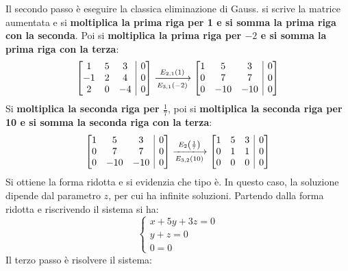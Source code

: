 \documentclass[a4paper]{article}
\makeatletter
\newenvironment{rowequmatbra}[1]{\left[\array{@{}#1@{}}}{\endarray\right]}
\makeatother
\begin{document}
	Il \textcolor{Red3}{secondo passo} è eseguire la classica eliminazione di Gauss. si scrive la matrice aumentata e si \textbf{moltiplica la prima riga per 1 e si somma la prima riga con la seconda}. Poi si \textbf{moltiplica la prima riga per $-2$ e si somma la prima riga con la terza}:
	\begin{equation*}
		\begin{rowequmatbra}{ccc|c}
			 1		& 5		&  3	& 0 \\
			-1 		& 2		&  4 	& 0 \\
			 2		& 0		& -4	& 0			
		\end{rowequmatbra} \xlongrightarrow[E_{3,1}\left(-2\right)]{E_{2,1}\left(1\right)}
		\begin{rowequmatbra}{ccc|c}
			1		& 5		&  3	& 0 \\
			0 		& 7		&  7 	& 0 \\
			0		& -10	& -10	& 0			
		\end{rowequmatbra}
	\end{equation*}
	Si \textbf{moltiplica la seconda riga per $\frac{1}{7}$}, poi si \textbf{moltiplica la seconda riga per 10 e si somma la seconda riga con la terza}:
	\begin{equation*}
		\begin{rowequmatbra}{ccc|c}
			1		& 5		&  3	& 0 \\
			0 		& 7		&  7 	& 0 \\
			0		& -10	& -10	& 0			
		\end{rowequmatbra} \xlongrightarrow[E_{3,2}\left(10\right)]{E_{2}\left(\frac{1}{7}\right)}
		\begin{rowequmatbra}{ccc|c}
			1		& 5		&  3	& 0 \\
			0 		& 1		&  1 	& 0 \\
			0		& 0		&  0	& 0			
		\end{rowequmatbra}
	\end{equation*}
	Si ottiene la forma ridotta e si evidenzia che tipo è. In questo caso, la soluzione dipende dal parametro $z$, per cui ha infinite soluzioni. Partendo dalla forma ridotta e riscrivendo il sistema si ha:
	\begin{equation*}
		\begin{cases}
			x + 5y + 3z = 0 \\
			y + z = 0		\\
			0 = 0
		\end{cases}
	\end{equation*}
	Il \textcolor{Red3}{terzo passo} è risolvere il sistema:
\end{document}
